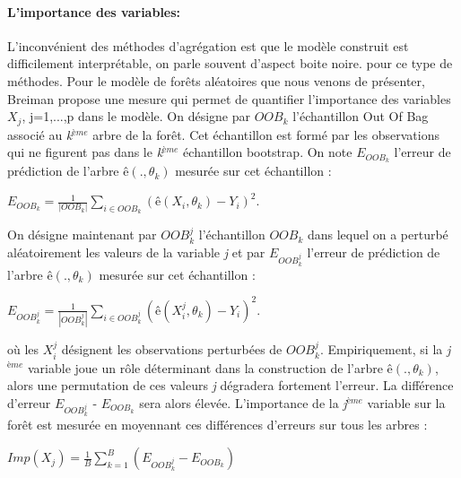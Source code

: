 \paragraph{L'importance des variables:}
	L'inconvénient des méthodes d'agrégation est que le modèle construit est difficilement interprétable, on parle souvent d'aspect boite noire.
	pour ce type de méthodes. Pour le modèle de forêts aléatoires que nous venons de présenter,
	Breiman\cite{BREI01} propose une mesure qui permet de quantifier l'importance des variables $X_j$, j=1,...,p dans le modèle.
	On désigne par $OOB_k$ l'échantillon Out Of Bag associé au \textit{k}$^{ème}$ arbre de la forêt. Cet échantillon est formé par les observations qui ne figurent pas dans le \textit{k}$^{ème}$ échantillon bootstrap. On note $E_{OOB_k}$ l'erreur de prédiction de l'arbre $ê(.,\theta_k)$ mesurée sur cet échantillon :
	\begin{center}
	$E_{OOB_k} = \frac{1}{|OOB_k|} \sum_{i \in OOB_k} (ê(X_i,\theta_k) -Y_i)^2.$
	\end{center}
	On désigne maintenant par $OOB_{k}^{j}$ l'échantillon $OOB_k$ dans lequel on a perturbé aléatoirement
	les valeurs de la variable \textit{j} et par $E_{OOB_{k}^{j}}$ l'erreur de prédiction de l'arbre $ê(.,\theta_k)$ mesurée sur cet échantillon :
	\begin{center}
		$E_{OOB_{k}^{j}} = \frac{1}{|OOB_{k}^{j}|} \sum_{i \in OOB_{k}^{j}} (ê(X_{i}^{j},\theta_k) -Y_i)^2.$
	\end{center}	
	où les $X_{i}^{j}$ désignent les observations perturbées de $OOB_{k}^{j}$. Empiriquement, si la \textit{j}$^{ème}$ variable joue un rôle déterminant dans la construction de l'arbre $ê(.,\theta_k)$, alors une permutation de ces valeurs \textit{j} dégradera fortement l'erreur. La différence d'erreur $E_{OOB_{k}^{j}}$ - $E_{OOB_k}$ sera alors élevée. L'importance de la \textit{j}$^{ème}$ variable sur la forêt est mesurée en moyennant ces différences d'erreurs sur tous les arbres :
	\begin{center}
	${Imp(X_j) = \frac{1}{B} \sum_{k=1}^{B} (E_{OOB_{k}^{j}} - E_{OOB_k}) }$
	\end{center}